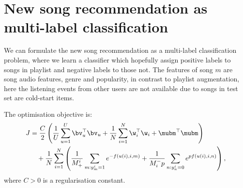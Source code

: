 \section{New song recommendation as multi-label classification}

We can formulate the new song recommendation as a multi-label classification problem,
where we learn a classifier which hopefully assign positive labels to songs in playlist and negative labels to those not.
The features of song $m$ are song audio features, genre and popularity, in contrast to playlist augmentation,
here the listening events from other users are not available due to songs in test set are cold-start items.

The optimisation objective is:
\begin{equation*}
\begin{aligned}
J &= \frac{C}{2} \left( \frac{1}{U} \sum_{u=1}^U \bv_u^\top \bv_u 
     + \frac{1}{N} \sum_{i=1}^N \w_i^\top \w_i + \mubm^\top \mubm \right) \\
& \hspace{1em}
     + \frac{1}{N} \sum_{i=1}^N \left( \frac{1}{M_+^i} \sum_{m: y_m^i = 1} e^{-f(u(i), i, m)} 
     + \frac{1}{M_i^- p} \sum_{n: y_n^i = 0} e^{p f(u(i), i, n)} \right),
\end{aligned}
\end{equation*}
where $C > 0$ is a regularisation constant.
